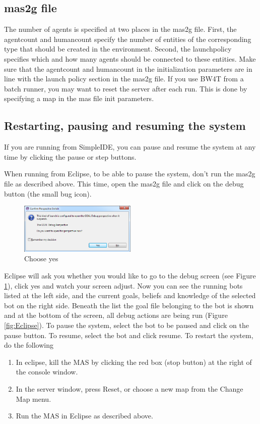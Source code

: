 \documentclass[11pt,a4paper]{article}
\begin{document}
\subsection{mas2g file}
The number of agents is specified at two places in the mas2g file. First, the agentcount and humancount specify the number of entities of the corresponding type that should be created in the environment. Second, the launchpolicy specifies which and how many agents should be connected to these entities. Make sure that the agentcount and humancount in the initialization parameters are in line with the launch policy section in the mas2g file. 
If you use BW4T from a batch runner, you may want to reset the server after each run. This is done by specifying a map in the mas file init parameters.

\subsection{Restarting, pausing and resuming the system}
If you are running from SimpleIDE, you can pause and resume the system at any time by clicking the pause or step buttons. 

When running from Eclipse, to be able to pause the system, don't run the mas2g file as described above. This time, open the mas2g file and click on the debug button (the small bug icon).

\begin{figure}
  \begin{center}
    \includegraphics[width=0.5\textwidth]{debug.png}
  \end{center}
  \caption{Choose yes}\label{fig:EclipseDebug}
\end{figure}
Eclipse will ask you whether you would like to go to the debug screen (see Figure \ref{fig:EclipseDebug}), click yes and watch your screen adjust.
Now you can see the running bots listed at the left side, and the current goals, beliefs and knowledge of the selected bot on the right side. Beneath the list the goal file belonging to the bot is shown and at the bottom of the screen, all debug actions are being run (Figure \ref{fig:Eclipse}).
To pause the system, select the bot to be paused and click on the pause button. To resume, select the bot and click resume.
To restart the system, do the following
\begin{enumerate}
\item In eclipse, kill the MAS by clicking the red box (stop button) at the right of the console window.
\item In the server window, press Reset, or choose a new map from the Change Map menu.
\item Run the MAS in Eclipse as described above.
\end{enumerate}
\end{document}
